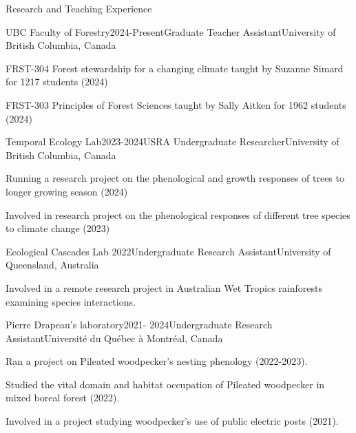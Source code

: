 \documentclass[
	11pt, %
]{resume} %
\begin{document}
\begin{rSection}{Research and Teaching Experience}

	\begin{rSubsection}{UBC Faculty of Forestry}{2024-Present}{Graduate Teacher Assistant}{University of British Columbia, Canada}
		\item  FRST-304 Forest stewardship for a changing climate taught by Suzanne Simard for 1217 students (2024)
		\item  FRST-303 Principles of Forest Sciences taught by Sally Aitken for 1962 students (2024) 
	\end{rSubsection}

	\begin{rSubsection}{Temporal Ecology Lab}{2023-2024}{USRA Undergraduate Researcher}{University of British Columbia, Canada}
		\item Running a research project on the phenological and growth responses of trees to longer growing season (2024) 
		\item Involved in research project on the phenological responses of different tree species to climate change (2023)
	\end{rSubsection}


	\begin{rSubsection}{Ecological Cascades Lab }{2022}{Undergraduate Research Assistant}{University of Queensland, Australia}
		\item Involved in a remote research project in Australian Wet Tropics rainforests examining species interactions.
	\end{rSubsection}


	\begin{rSubsection}{Pierre Drapeau’s laboratory}{2021- 2024}{Undergraduate Research Assistant}{Université du Québec à Montréal, Canada}
		\item Ran a project on Pileated woodpecker's nesting phenology (2022-2023).
		\item Studied the vital domain and habitat occupation of Pileated woodpecker in mixed boreal forest (2022).
		\item Involved in a project studying woodpecker's use of public electric posts (2021).
	\end{rSubsection}
\end{rSection}

\end{document}
